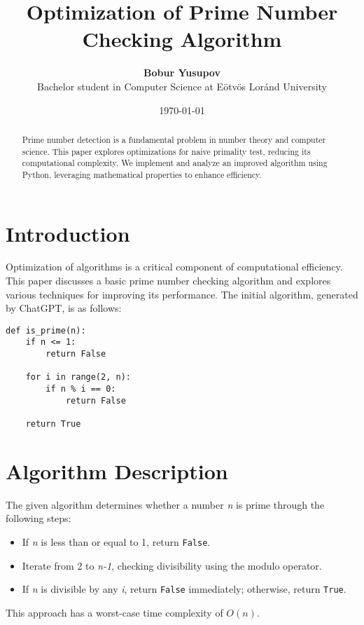 \documentclass[a4paper,11pt]{article}
\title{\LARGE \textbf{Optimization of Prime Number Checking Algorithm}}
\author{\large \textbf{Bobur Yusupov}\\ \small Bachelor student in Computer Science at  Eötvös Loránd University}
\date{\today}
\begin{document}
\maketitle

\begin{abstract}
Prime number detection is a fundamental problem in number theory and computer science. This paper explores optimizations for naive primality test, reducing its computational complexity. We implement and analyze an improved algorithm using Python, leveraging mathematical properties to enhance efficiency.
\end{abstract}

\section{Introduction}
Optimization of algorithms is a critical component of computational efficiency. This paper discusses a basic prime number checking algorithm and explores various techniques for improving its performance. The initial algorithm, generated by ChatGPT, is as follows:

\begin{lstlisting}[caption={Naive Prime Number Checking Algorithm}, label={code:prime-check}]
def is_prime(n):
    if n <= 1:
        return False
    
    for i in range(2, n):
        if n % i == 0:
            return False
    
    return True
\end{lstlisting}

\section{Algorithm Description}
The given algorithm determines whether a number \textit{n} is prime through the following steps:
\begin{itemize}
    \item If \textit{n} is less than or equal to 1, return \texttt{False}.
    \item Iterate from 2 to \textit{n-1}, checking divisibility using the modulo operator.
    \item If \textit{n} is divisible by any \textit{i}, return \texttt{False} immediately; otherwise, return \texttt{True}.
\end{itemize}
This approach has a worst-case time complexity of \(O(n)\).
\end{document}
